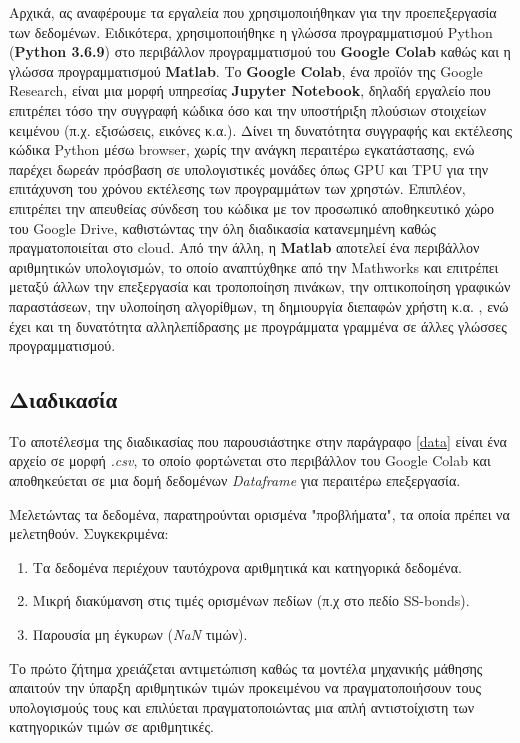 \medskip
Αρχικά, ας αναφέρουμε τα εργαλεία που χρησιμοποιήθηκαν για την προεπεξεργασία των δεδομένων. Ειδικότερα, χρησιμοποιήθηκε η γλώσ\-σα προγραμματισμού Python (\textbf{Python 3.6.9}) στο περιβάλλον προγραμματισμού του \textbf{Google Colab} καθώς και η γλώσσα προγραμματισμού \textbf{Matlab}. Το \textbf{Google Colab}, ένα προϊόν της Google Research, είναι μια μορφή υπηρεσίας \textbf{Jupyter Notebook}, δηλαδή εργαλείο που επιτρέπει τόσο την συγγραφή κώδικα όσο και την υποστήριξη πλούσιων στοιχείων κειμένου (π.χ. εξισώσεις, εικόνες κ.α.). Δίνει τη δυνατότητα συγγραφής και εκτέλεσης κώδικα Python μέσω browser, χωρίς την ανάγκη περαιτέρω εγκατάστασης, ενώ παρέχει δωρεάν πρόσβαση σε υπολογιστικές μονάδες όπως GPU και TPU για την επιτάχυνση του χρόνου εκτέλεσης των προγραμμάτων των χρηστών. Επιπλέον, επιτρέπει την απευθείας σύνδεση του κώδικα με τον προσωπικό αποθηκευτικό χώρο του Google Drive, καθιστώντας την όλη διαδικασία κατανεμημένη καθώς πραγματοποιείται στο cloud. Από την άλλη, η \textbf{Matlab} αποτελεί ένα περιβάλλον αριθμητικών υπολογισμών, το οποίο αναπτύχθηκε από την Mathworks και επιτρέπει μεταξύ άλλων την επεξεργασία και τροποποίηση πινάκων, την οπτικοποίηση γραφικών παραστάσεων, την υλοποίηση αλγορίθμων, τη δημιουργία διεπαφών χρήστη κ.α. , ενώ έχει και τη δυνατότητα αλληλεπίδρασης με προγράμματα γραμμένα σε άλλες γλώσσες προγραμματισμού.

\subsection{Διαδικασία}

Το αποτέλεσμα της διαδικασίας που παρουσιάστηκε στην παράγραφο \ref{data} είναι ένα αρχείο σε μορφή \textit{.csv}, το οποίο φορτώνεται στο περιβάλλον του Google Colab και αποθηκεύεται σε μια δομή δεδομένων \textit{Dataframe} για περαιτέρω επεξεργασία. 

Μελετώντας τα δεδομένα, παρατηρούνται ορισμένα "προβλήματα", τα οποία πρέπει να μελετηθούν. Συγκεκριμένα:

\begin{enumerate}
    \item Τα δεδομένα περιέχουν ταυτόχρονα αριθμητικά και κατηγορικά δεδομένα.
    \item Μικρή διακύμανση στις τιμές ορισμένων πεδίων (π.χ στο πεδίο SS-bonds).
    \item Παρουσία μη έγκυρων (\textit{NaN} τιμών).
\end{enumerate}

Το πρώτο ζήτημα χρειάζεται αντιμετώπιση καθώς τα μοντέλα μηχανικής μάθησης απαιτούν την ύπαρξη αριθμητικών τιμών προκειμένου να πραγματοποιήσουν τους υπολογισμούς τους και επιλύεται πραγματοποιώντας μια απλή αντιστοίχιστη των κατηγορικών τιμών σε αριθμητικές. 

